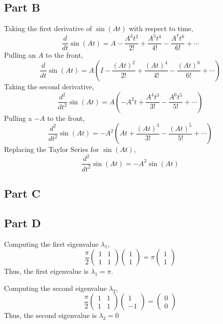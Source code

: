 \documentclass{article}
\begin{document}
\subsection*{Part B}

Taking the first derivative of $\sin(At)$ with respect to time,
$$ \frac{d}{dt} \sin(At) = A - \frac{A^3 t^2}{2!} + \frac{A^5 t^4}{4!} -
\frac{A^7 t^6}{6!} + \cdots $$
Pulling an $A$ to the front,
$$ \frac{d}{dt} \sin(At) = A \left(I - \frac{(At)^2}{2!} + \frac{(At)^4}{4!}
- \frac{(At)^6}{6!} + \cdots\right) $$
Taking the second derivative,
$$ \frac{d^2}{dt^2} \sin(At) = A \left(-A^2 t + \frac{A^4 t^3}{3!} -
\frac{A^6 t^5}{5!} + \cdots\right) $$
Pulling a $-A$ to the front,
$$ \frac{d^2}{dt^2} \sin(At) = -A^2 \left(At + \frac{(At)^3}{3!} -
\frac{(At)^5}{5!} + \cdots \right) $$
Replacing the Taylor Series for $\sin(At)$,
$$ \frac{d^2}{dt^2} \sin(At) = -A^2 \sin(At) $$

\subsection*{Part C}

\subsection*{Part D}

Computing the first eigenvalue $\lambda_1$,
$$ \frac{\pi}{2} \begin{pmatrix}
  1 & 1 \\
  1 & 1 
\end{pmatrix} \begin{pmatrix}
  1 \\
  1
\end{pmatrix} = \pi \begin{pmatrix}
  1 \\
  1
\end{pmatrix} $$
Thus, the first eigenvalue is $\lambda_1 = \pi$.

Computing the second eigenvalue $\lambda_2$,
$$ \frac{\pi}{2} \begin{pmatrix}
  1 & 1 \\
  1 & 1 
\end{pmatrix} \begin{pmatrix}
  1 \\
  -1
\end{pmatrix} = \begin{pmatrix}
  0 \\
  0
\end{pmatrix} $$
Thus, the second eigenvalue is $\lambda_2 = 0$
\end{document}
